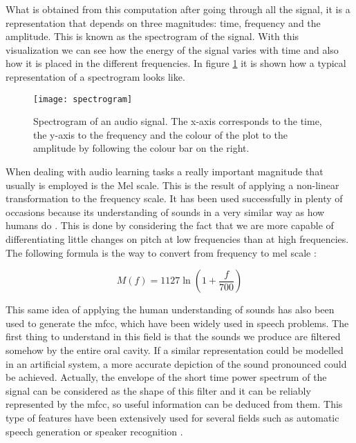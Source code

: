 	What is obtained from this computation after going through all the signal, it is a representation that depends on three magnitudes: time, frequency and the amplitude. This is known as the spectrogram of the signal. With this visualization we can see how the energy of the signal varies with time and also how it is placed in the different frequencies. In figure \ref{fig:mesh51} it is shown how a typical representation of a spectrogram looks like. 
	
	\begin{figure}[H]
		\centering
		\captionsetup{justification=centering}
		\texttt{[image: spectrogram]}
		\caption{Spectrogram of an audio signal. The x-axis corresponds to the time, the y-axis to the frequency and the colour of the plot to the amplitude by following the colour bar on the right.}
		\label{fig:mesh51}
	\end{figure}

	When dealing with audio learning tasks a really important magnitude that usually is employed is the Mel scale. This is the result of applying a non-linear transformation to the frequency scale. It has been used successfully in plenty of occasions because its understanding of sounds in a very similar way as how humans do \cite{Gartzman2019}. This is done by considering the fact that we are more capable of differentiating little changes on pitch at low frequencies than at high frequencies. The following formula is the way to convert from frequency to mel scale \cite{Beranek1950}:
	
	\[M(f) = 1127 \ln{(1 + \frac{f}{700})}\]
	
	This same idea of applying the human understanding of sounds has also been used to generate the \acrfull{mfcc}, which have been widely used in speech problems. The first thing to understand in this field is that the sounds we produce are filtered somehow by the entire oral cavity. If a similar representation could be modelled in an artificial system, a more accurate depiction of the sound pronounced could be achieved. Actually, the envelope of the short time power spectrum of the signal can be considered as the shape of this filter and it can be reliably represented by the \acrshort{mfcc}, so useful information can be deduced from them. This type of features have been extensively used for several fields such as automatic speech generation or speaker recognition \cite{Giannakopoulos2014}. 
	
	
	
	
	